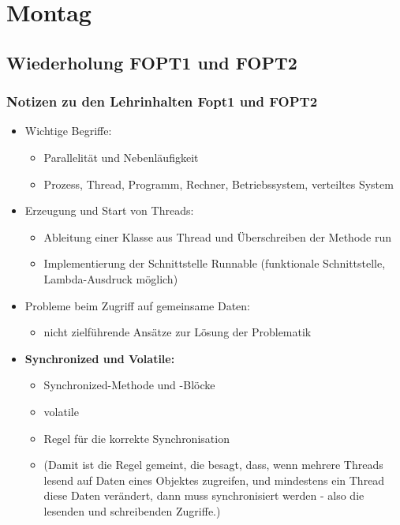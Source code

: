 \section{Montag}

\subsection{Wiederholung FOPT1 und FOPT2}

\subsubsection{Notizen zu den Lehrinhalten Fopt1 und FOPT2}
    \begin{itemize}
        \item Wichtige Begriffe:
        \begin{itemize}
                  \item Parallelität und Nebenläufigkeit
                  \item Prozess, Thread, Programm, Rechner, Betriebssystem, verteiltes System
        \end{itemize}
        \item Erzeugung und Start von Threads:
        \begin{itemize}
            \item Ableitung einer Klasse aus Thread und Überschreiben der Methode run
            \item Implementierung der Schnittstelle Runnable (funktionale Schnittstelle, Lambda-Ausdruck möglich)
        \end{itemize}
        \item Probleme beim Zugriff auf gemeinsame Daten:
        \begin{itemize}
            \item nicht zielführende Ansätze zur Lösung der Problematik
        \end{itemize}

        \item \textbf{Synchronized und Volatile:}
        \begin{itemize}
            \item Synchronized-Methode und -Blöcke
            \item volatile
            \item Regel für die korrekte Synchronisation
            \item[] (Damit ist die Regel gemeint, die besagt, dass, wenn mehrere Threads lesend auf Daten eines Objektes zugreifen, und mindestens ein Thread diese Daten verändert, dann muss synchronisiert werden - also die lesenden und schreibenden Zugriffe.)
        \end{itemize}


\end{itemize}
